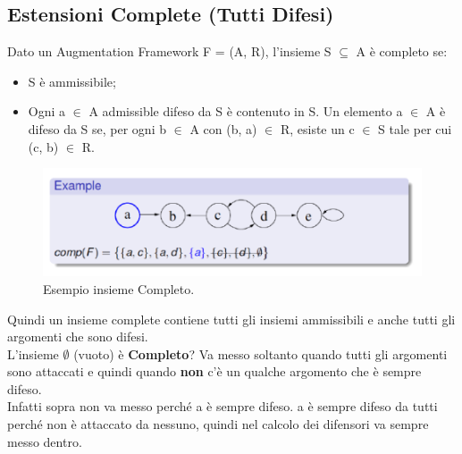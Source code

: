 \subsection{Estensioni Complete (Tutti Difesi)}
Dato un Augmentation Framework F = (A, R), l'insieme S $\subseteq$ A è completo
se:
\begin{itemize}
    \item S è ammissibile;
    \item Ogni a $\in$ A admissible difeso da S è contenuto in S. Un elemento a $\in$ A è
          difeso da S se, per ogni b $\in$ A con (b, a) $\in$ R, esiste un c $\in$ S
          tale per cui (c, b) $\in$ R.
\end{itemize}
\begin{figure}[htp]
    \centering
    \includegraphics[width=12cm, keepaspectratio]{img/Cap6/completo.png}
    \caption{Esempio insieme Completo.}
\end{figure}
Quindi un insieme complete contiene tutti gli insiemi ammissibili e anche tutti
gli argomenti che sono difesi.\\
L'insieme $\emptyset$ (vuoto) è \textbf{Completo}? Va messo
soltanto quando tutti gli argomenti sono attaccati e quindi quando \textbf{non}
c'è un qualche argomento che è sempre difeso.\\
Infatti sopra non va messo
perché a è sempre difeso. a è sempre difeso da tutti perché non è attaccato da
nessuno, quindi nel calcolo dei difensori va sempre messo dentro.
